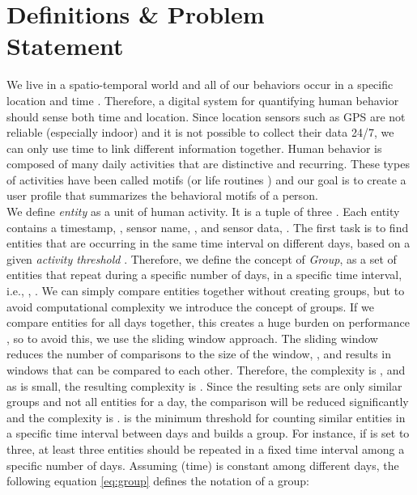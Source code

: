 \documentclass{sig-alternate}
\begin{document}
\section{Definitions \& Problem \\ Statement}
We live in a spatio-temporal world and all of our behaviors occur in a specific location and time \cite{towsharing}. Therefore, a digital system for quantifying human behavior should sense both time and location. Since location sensors such as GPS are not reliable (especially indoor) and it is not possible to collect their data 24/7, we can only use time to link different information together. Human behavior is composed of many daily activities that are distinctive and recurring. These types of activities have been called motifs (or life routines \cite{realitymining}) and our goal is to create a user profile that summarizes the behavioral motifs of a person. \\
We define \emph{entity} as a unit of human activity. It is a tuple of three . Each entity contains a timestamp, , sensor name, , and sensor data, . The first task is to find entities that are occurring in the same time interval on different days, based on a given \emph{activity threshold} . Therefore, we define the concept of \emph{Group},  as a set of entities that repeat during a specific number of days, in a specific time interval, i.e.,  , . We can simply compare entities together without creating groups, but to avoid computational complexity we introduce the concept of groups. If we compare entities for all days together, this creates a huge burden on performance , so to avoid this, we use the sliding window approach. The sliding window reduces the number of comparisons to the size of the window, , and results in windows that can be compared to each other. Therefore, the complexity is , and as  is small, the resulting complexity is . Since the resulting sets are only similar groups and not all entities for a day, the comparison will be reduced significantly and the complexity is .  is the minimum threshold for counting similar entities in a specific time interval between days and builds a group. For instance, if  is set to three, at least three entities should be repeated in a fixed time interval among a specific number of days. Assuming  (time) is constant among different days, the following equation \ref{eq:group} defines the notation of a group:
\end{document}
